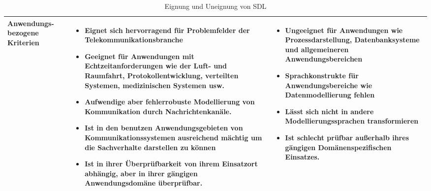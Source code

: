 \begin{table}[ht]
	\begin{tabularx}{\textwidth}{|p{2cm}|X|X|}
		\hline
		Anwendungs-bezogene	Kriterien &
		\begin{itemize}
			\item Eignet sich hervorragend für Problemfelder der Telekommunikationsbranche
			\item Geeignet für Anwendungen mit Echtzeitanforderungen wie der Luft- und Raumfahrt, Protokollentwicklung, verteilten Systemen, medizinischen Systemen usw. 
			\item Aufwendige aber fehlerrobuste	Modellierung von Kommunikation durch Nachrichtenkanäle.
			\item Ist in den benutzen Anwendungsgebieten von Kommunikationssystemen ausreichend mächtig um die Sachverhalte darstellen zu können
			\item Ist in ihrer Überprüfbarkeit von ihrem Einsatzort abhängig, aber in ihrer gängigen Anwendungsdomäne überprüfbar. 
		\end{itemize}  & 
		\begin{itemize}
			\item Ungeeignet für Anwendungen wie Prozessdarstellung, Datenbanksysteme und allgemeineren Anwendungsbereichen
			\item Sprachkonstrukte für Anwendungsbereiche  wie Datenmodellierung fehlen
			\item Lässt sich nicht in andere Modellierungssprachen transformieren
			\item Ist schlecht prüfbar außerhalb ihres gängigen Domänenspezifischen Einsatzes.
		\end{itemize} \\
		\hline
	\end{tabularx} 
\caption{Eignung und Uneignung von SDL}
\label{tab:EignungSDL}
\end{table} 